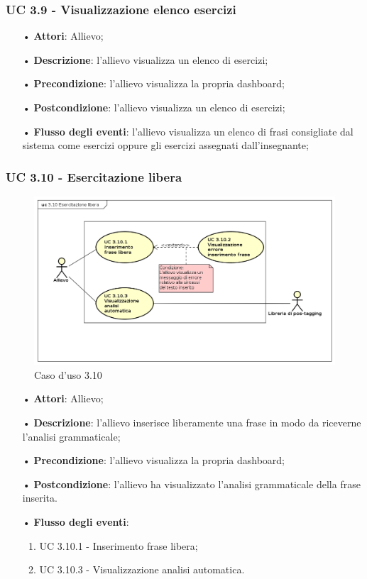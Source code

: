 \subsubsection{UC 3.9 - Visualizzazione elenco esercizi}
\begin{itemize}
\item[•]\textbf{Attori}: Allievo;
\item[•]\textbf{Descrizione}: l'allievo visualizza un elenco di esercizi;
\item[•]\textbf{Precondizione}: l'allievo visualizza la propria dashboard;
\item[•]\textbf{Postcondizione}: l'allievo visualizza un elenco di esercizi;
\item[•]\textbf{Flusso degli eventi}: l'allievo visualizza un elenco di frasi consigliate dal sistema come esercizi oppure gli esercizi assegnati dall'insegnante;
\end{itemize}

\subsubsection{UC 3.10 - Esercitazione libera}
\begin{figure}[H]
	\centering
	\includegraphics[width=17cm]{img/UC310.png} 
	\caption{Caso d'uso 3.10}\label{fig:310}
\end{figure}
\begin{itemize}
\item[•]\textbf{Attori}: Allievo;
\item[•]\textbf{Descrizione}: l'allievo inserisce liberamente una frase in modo da riceverne l'analisi grammaticale;
\item[•]\textbf{Precondizione}: l'allievo visualizza la propria dashboard;
\item[•]\textbf{Postcondizione}: l'allievo ha visualizzato l'analisi grammaticale della frase inserita.
\item[•]\textbf{Flusso degli eventi}:
\begin{enumerate}
	\item UC 3.10.1 - Inserimento frase libera;
	\item UC 3.10.3 - Visualizzazione analisi automatica.
\end{enumerate}
\end{itemize}

